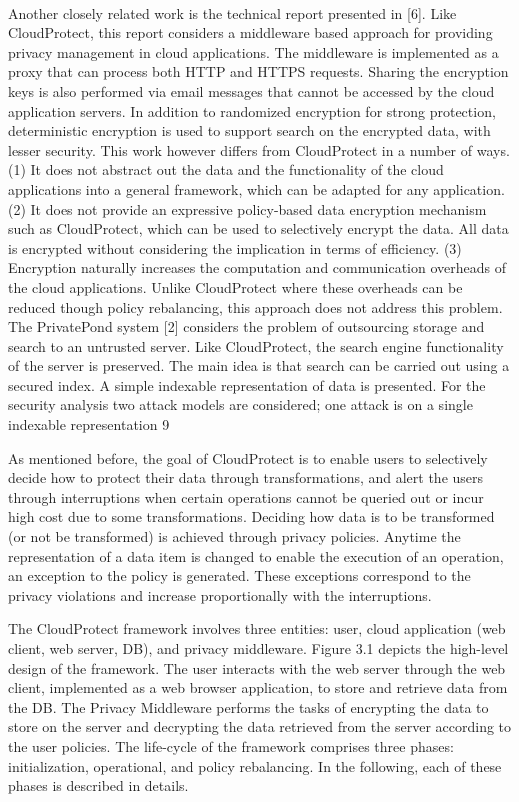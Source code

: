\documentclass[11pt,onecolumn]{article}
\begin{document}
\paragraph{}
Another closely related work is the technical report presented in [6]. Like CloudProtect,
this report considers a middleware based approach for providing privacy management
in cloud applications. The middleware is implemented as a proxy that can
process both HTTP and HTTPS requests. Sharing the encryption keys is also performed
via email messages that cannot be accessed by the cloud application servers.
In addition to randomized encryption for strong protection, deterministic encryption
is used to support search on the encrypted data, with lesser security. This work however
differs from CloudProtect in a number of ways. (1) It does not abstract out the
data and the functionality of the cloud applications into a general framework, which
can be adapted for any application. (2) It does not provide an expressive policy-based
data encryption mechanism such as CloudProtect, which can be used to selectively
encrypt the data. All data is encrypted without considering the implication in terms
of efficiency. (3) Encryption naturally increases the computation and communication
overheads of the cloud applications. Unlike CloudProtect where these overheads can
be reduced though policy rebalancing, this approach does not address this problem.
The PrivatePond system [2] considers the problem of outsourcing storage and search
to an untrusted server. Like CloudProtect, the search engine functionality of the server
is preserved. The main idea is that search can be carried out using a secured index.
A simple indexable representation of data is presented. For the security analysis
two attack models are considered; one attack is on a single indexable representation
9

As mentioned before, the goal of CloudProtect is to enable users to selectively decide
how to protect their data through transformations, and alert the users through
interruptions when certain operations cannot be queried out or incur high cost due
to some transformations. Deciding how data is to be transformed (or not be transformed)
is achieved through privacy policies. Anytime the representation of a data
item is changed to enable the execution of an operation, an exception to the policy
is generated. These exceptions correspond to the privacy violations and increase
proportionally with the interruptions.


The CloudProtect framework involves three entities: user, cloud application (web
client, web server, DB), and privacy middleware. Figure 3.1 depicts the high-level
design of the framework. The user interacts with the web server through the web
client, implemented as a web browser application, to store and retrieve data from
the DB. The Privacy Middleware performs the tasks of encrypting the data to store
on the server and decrypting the data retrieved from the server according to the
user policies. The life-cycle of the framework comprises three phases: initialization,
operational, and policy rebalancing. In the following, each of these phases is described in details.
\end{document}
